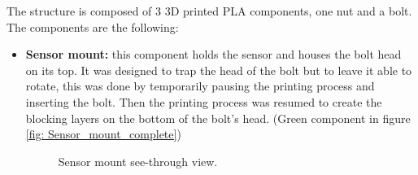 The structure is composed of 3 3D printed PLA components, one nut and a bolt.
The components are the following:
\begin{itemize}
    \item \textbf{Sensor mount:} this component holds the sensor and houses the bolt head on its top. It was designed to trap the head of the bolt but to leave it able to rotate, this was done by temporarily pausing the printing process and inserting the bolt. Then the printing process was resumed to create the blocking layers on the bottom of the bolt's head. (Green component in figure \ref{fig: Sensor_mount_complete})
    \begin{figure}
        \centering
        \caption{Sensor mount see-through view.}
        \label{fig: Sensor_mount}
    \end{figure}


\end{itemize}
